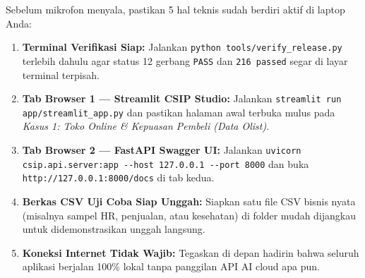 \documentclass[11pt,a4paper,oneside]{book}
\newcommand{\code}[1]{{\small\nolinkurl{#1}}}
\begin{document}
Sebelum mikrofon menyala, pastikan 5 hal teknis sudah berdiri aktif di laptop Anda:
\begin{enumerate}
  \item \textbf{Terminal Verifikasi Siap:} Jalankan \code{python tools/verify_release.py} terlebih dahulu agar status 12 gerbang \code{PASS} dan \code{216 passed} segar di layar terminal terpisah.
  \item \textbf{Tab Browser 1 --- Streamlit CSIP Studio:} Jalankan \code{streamlit run app/streamlit_app.py} dan pastikan halaman awal terbuka mulus pada \emph{Kasus 1: Toko Online \& Kepuasan Pembeli (Data Olist)}.
  \item \textbf{Tab Browser 2 --- FastAPI Swagger UI:} Jalankan \code{uvicorn csip.api.server:app --host 127.0.0.1 --port 8000} dan buka \code{http://127.0.0.1:8000/docs} di tab kedua.
  \item \textbf{Berkas CSV Uji Coba Siap Unggah:} Siapkan satu file CSV bisnis nyata (misalnya sampel HR, penjualan, atau kesehatan) di folder mudah dijangkau untuk didemonstrasikan unggah langsung.
  \item \textbf{Koneksi Internet Tidak Wajib:} Tegaskan di depan hadirin bahwa seluruh aplikasi berjalan 100\% lokal tanpa panggilan API AI cloud apa pun.
\end{enumerate}
\end{document}
